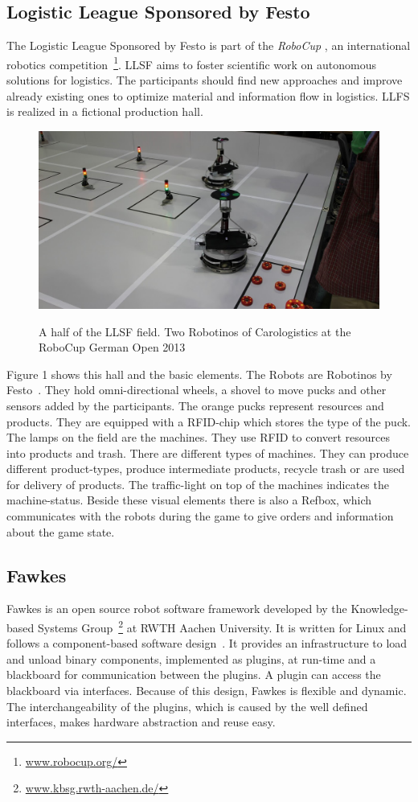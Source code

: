\documentclass[11pt,a4paper,titlepage]{article}
\begin{document}
\subsection{Logistic League Sponsored by Festo}
The Logistic League Sponsored by Festo is part of the \textit{RoboCup
}, an international robotics competition~\footnote{\url{www.robocup.org/}}. LLSF aims to foster scientific work on autonomous solutions for logistics. The participants should find new approaches and improve already existing ones to optimize material and information flow in logistics. LLFS is realized in a fictional production hall. 
\begin{figure}
\includegraphics[scale=0.3]{pics/llsf}
\label{Figure 1}
\caption{A half of the LLSF field. Two Robotinos of Carologistics at the RoboCup German Open 2013}
\end{figure}
Figure 1 shows this hall and the basic elements. The Robots are Robotinos by Festo~\cite{Robotino}. They hold omni-directional wheels, a shovel to move pucks and other sensors added by the participants. The orange pucks represent resources and products. They are equipped with a RFID-chip which stores the type of the puck. The lamps on the field are the machines. They use RFID to convert resources into products and trash. There are different types of machines. They can produce different product-types, produce intermediate products, recycle trash or are used for delivery of products. The traffic-light on top of the machines indicates the machine-status. Beside these visual elements there is also a Refbox, which communicates with the robots during the game to give orders and information about the game state.
\subsection{Fawkes}
Fawkes is an open source robot software framework developed by the Knowledge-based Systems Group~\footnote{\url{www.kbsg.rwth-aachen.de/}} at RWTH Aachen University. It is written for Linux and follows a component-based software design~\cite{FawkesDesign}. It provides an infrastructure to load and unload binary components, implemented as plugins, at run-time and a blackboard for communication between the plugins. A plugin can access the blackboard via interfaces. Because of this design, Fawkes is flexible and dynamic. The interchangeability of the plugins, which is caused by the well defined interfaces, makes hardware abstraction and reuse easy.\\
\end{document}
